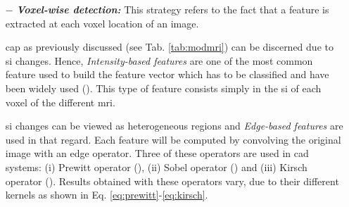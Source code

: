 \begin{enumerate}[leftmargin=*]

\item[$-$] \textbf{\textit{Voxel-wise detection:}} This strategy refers to the fact that a feature is extracted at each voxel location of an image.

\ac{cap} as previously discussed (see Tab. \ref{tab:modmri}) can be discerned due to \ac{si} changes. Hence, \textit{Intensity-based features} are one of the most common feature used to build the feature vector which has to be classified and have been widely used (\cite{Ampeliotis2007,Ampeliotis2008,Artan2009,Artan2010,Chan2003,Langer2009,Liu2009,Niaf2011,Niaf2012,Viswanath2008a,Viswanath2011}). This type of feature consists simply in the \ac{si} of each voxel of the different \ac{mri}.

\Ac{si} changes can be viewed as heterogeneous regions and \textit{Edge-based features} are used in that regard. Each feature will be computed by convolving the original image with an edge operator. Three of these operators are used in \ac{cad} systems: (i) Prewitt operator (\cite{Prewitt1970}), (ii) Sobel operator (\cite{Sobel1970}) and (iii) Kirsch operator (\cite{Kirsch1971}). Results obtained with these operators vary, due to their different kernels as shown in Eq. \ref{eq:prewitt}-\ref{eq:kirsch}.


\end{enumerate}

